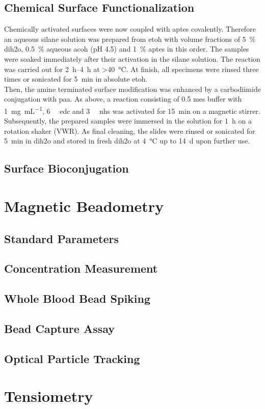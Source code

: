\subsection{Chemical Surface Functionalization}
Chemically activated surfaces were now coupled with \gls{aptes} covalently. Therefore an aqueous silane solution was prepared from \gls{etoh} with volume fractions of \SI{5}{\percent} \gls{dih2o}, \SI{0.5}{\percent} aqueous \gls{acoh} (pH 4.5) and \SI{1}{\percent} \gls{aptes} in this order. The samples were soaked immediately after their activation in the silane solution. The reaction was carried out for \SIrange{2}{4}{\hour} at \SI{>40}{\degreeCelsius}. At finish, all specimens were rinsed three times or sonicated for \SI{5}{\minute} in absolute \gls{etoh}.\\
Then, the amine terminated surface modification was enhanced by a carbodiimide conjugation with \gls{paa}. As above, a reaction consisting of \SI{0.5}{\molar} \gls{mes} buffer with \SI{1}{\milli\gram\per\milli\liter}, \SI{6}{\milli\molar} \gls{edc} and  \SI{3}{\milli\molar} \gls{nhs} was activated for \SI{15}{\minute} on a magnetic stirrer. Subsequently, the prepared samples were immersed in the solution for \SI{1}{\hour} on a rotation shaker (VWR). As final cleaning, the slides were rinsed or sonicated for \SI{5}{\minute} in \gls{dih2o} and stored in fresh \gls{dih2o} at \SI{4}{\degreeCelsius} up to \SI{14}{\day} upon further use.\cite{lib:chem:Anti-EpCAM-PAA}
\subsection{Surface Bioconjugation}

\section{Magnetic Beadometry}

\subsection{Standard Parameters}

\subsection{Concentration Measurement}

\subsection{Whole Blood Bead Spiking}

\subsection{Bead Capture Assay}

\subsection{Optical Particle Tracking}

\section{Tensiometry}



